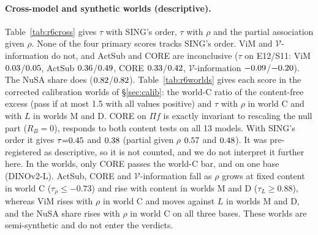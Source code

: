\documentclass[10pt]{article}
\begin{document}
\paragraph{Cross-model and synthetic worlds (descriptive).} Table~\ref{tab:r6cross} gives $\tau$ with SING's order, $\tau$ with $\rho$ and the partial association given $\rho$. None of the four primary scores tracks SING's order. ViM and $\mathcal{V}$-information do not, and ActSub and CORE are inconclusive ($\tau$ on E12/S11: ViM $0.03$/$0.05$, ActSub $0.36$/$0.49$, CORE $0.33$/$0.42$, $\mathcal{V}$-information $-0.09$/$-0.20$). The NuSA share does ($0.82$/$0.82$). Table~\ref{tab:r6worlds} gives each score in the corrected calibration worlds of \S\ref{sec:calib}: the world-C ratio of the content-free excess (pass if at most 1.5 with all values positive) and $\tau$ with $\rho$ in world C and with $L$ in worlds M and D. CORE on $\Pi f$ is exactly invariant to rescaling the null part ($R_B{=}0$), responds to both content tests on all 13 models. With SING's order it gives $\tau{=}0.45$ and $0.38$ (partial given $\rho$ $0.57$ and $0.48$). It was pre-registered as descriptive, so it is not counted, and we do not interpret it further here. In the worlds, only CORE passes the world-C bar, and on one base (DINOv2-L). ActSub, CORE and $\mathcal{V}$-information fall as $\rho$ grows at fixed content in world C ($\tau_\rho \le -0.73$) and rise with content in worlds M and D ($\tau_L \ge 0.88$), whereas ViM rises with $\rho$ in world C and moves against $L$ in worlds M and D, and the NuSA share rises with $\rho$ in world C on all three bases. These worlds are semi-synthetic and do not enter the verdicts.
\end{document}
